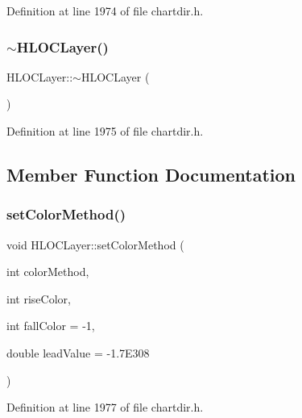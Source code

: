 Definition at line 1974 of file chartdir.\+h.

\mbox{\label{class_h_l_o_c_layer_a2e9bd4ccf461e881cc1b064153065c9f}} 
\subsubsection{\texorpdfstring{$\sim$\+H\+L\+O\+C\+Layer()}{~HLOCLayer()}}
{\footnotesize\ttfamily H\+L\+O\+C\+Layer\+::$\sim$\+H\+L\+O\+C\+Layer (\begin{DoxyParamCaption}{ }\end{DoxyParamCaption})\hspace{0.3cm}{\ttfamily [inline]}}



Definition at line 1975 of file chartdir.\+h.



\subsection{Member Function Documentation}
\mbox{\label{class_h_l_o_c_layer_aa7c17220be7b3289bce51d7b02fd6407}} 
\subsubsection{\texorpdfstring{set\+Color\+Method()}{setColorMethod()}}
{\footnotesize\ttfamily void H\+L\+O\+C\+Layer\+::set\+Color\+Method (\begin{DoxyParamCaption}\item[{int}]{color\+Method,  }\item[{int}]{rise\+Color,  }\item[{int}]{fall\+Color = {\ttfamily -\/1},  }\item[{double}]{lead\+Value = {\ttfamily -\/1.7E308} }\end{DoxyParamCaption})\hspace{0.3cm}{\ttfamily [inline]}}



Definition at line 1977 of file chartdir.\+h.


